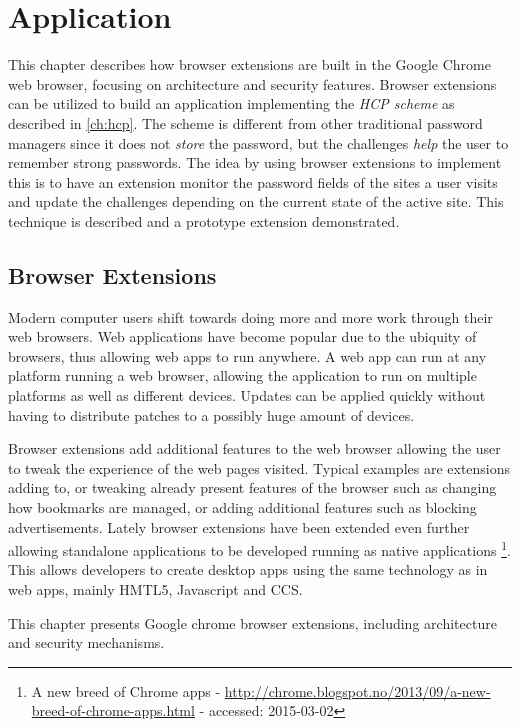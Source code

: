 \chapter{Application}\label{app}
This chapter describes how browser extensions are built in the Google Chrome web browser, focusing on architecture and security features. Browser extensions can be utilized to build an application implementing the \emph{HCP scheme} as described in \autoref{ch:hcp}. The scheme is different from other traditional password managers since it does not \emph{store} the password, but the challenges \emph{help} the user to remember strong passwords. The idea by using browser extensions to implement this is to have an extension monitor the password fields of the sites a user visits and update the challenges depending on the current state of the active site. This technique is described and a prototype extension demonstrated. 
\section{Browser Extensions}\label{browser-extensions}
Modern computer users shift towards doing more and more work through their web browsers. Web applications have become popular due to the ubiquity of browsers, thus allowing web apps to run anywhere. A web app can run at any platform running a web browser, allowing the application to run on multiple platforms as well as different devices. Updates can be applied quickly without having to distribute patches to a possibly huge amount of devices.
\par Browser extensions add additional features to the web browser allowing the user to tweak the experience of the web pages visited. Typical examples are extensions adding to, or tweaking already present features of the browser such as changing how bookmarks are managed, or adding additional features such as blocking advertisements. Lately browser extensions have been extended even further allowing standalone applications to be developed running as native applications \footnote{A new breed of Chrome apps - \url{http://chrome.blogspot.no/2013/09/a-new-breed-of-chrome-apps.html} - accessed: 2015-03-02}. This allows developers to create desktop apps using the same technology as in web apps, mainly HMTL5, Javascript and CCS.
\par This chapter presents Google chrome browser extensions, including architecture and security mechanisms.


